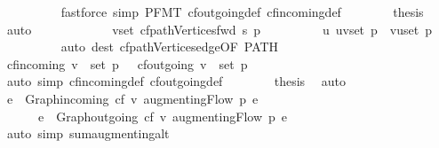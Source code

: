 \begin{isabellebody}
\ \ \ \ \ \ \ \ \isamarkupfalse%
\ {\isacharparenleft}fastforce\ simp{\isacharcolon}\ P{\isacharunderscore}FMT\ cf{\isachardot}outgoing{\isacharunderscore}def\ cf{\isachardot}incoming{\isacharunderscore}def{\isacharparenright}{\isacharplus}\isanewline
\ \ \ \ \ \ \isamarkupfalse%
\ {\isacharquery}thesis\ \isamarkupfalse%
\ auto\isanewline
\ \ \ \ \isamarkupfalse%
\isanewline
\ \ \ \ \ \ \isamarkupfalse%
\ {\isachardoublequoteopen}v{\isasymnotin}set\ {\isacharparenleft}cf{\isachardot}pathVertices{\isacharunderscore}fwd\ s\ p{\isacharparenright}{\isachardoublequoteclose}\isanewline
\ \ \ \ \ \ \isamarkupfalse%
\ \isamarkupfalse%
\ {\isachardoublequoteopen}{\isasymforall}u{\isachardot}\ {\isacharparenleft}u{\isacharcomma}v{\isacharparenright}{\isasymnotin}set\ p\ {\isasymand}\ {\isacharparenleft}v{\isacharcomma}u{\isacharparenright}{\isasymnotin}set\ p{\isachardoublequoteclose}\isanewline
\ \ \ \ \ \ \ \ \isamarkupfalse%
\ {\isacharparenleft}auto\ dest{\isacharcolon}\ cf{\isachardot}pathVertices{\isacharunderscore}edge{\isacharbrackleft}OF\ PATH{\isacharbrackright}{\isacharparenright}\isanewline
\ \ \ \ \ \ \isamarkupfalse%
\ {\isachardoublequoteopen}cf{\isachardot}incoming\ v\ {\isasyminter}\ set\ p\ {\isacharequal}\ {\isacharbraceleft}{\isacharbraceright}{\isachardoublequoteclose}\ {\isachardoublequoteopen}cf{\isachardot}outgoing\ v\ {\isasyminter}\ set\ p\ {\isacharequal}\ {\isacharbraceleft}{\isacharbraceright}{\isachardoublequoteclose}\isanewline
\ \ \ \ \ \ \ \ \isamarkupfalse%
\ {\isacharparenleft}auto\ simp{\isacharcolon}\ cf{\isachardot}incoming{\isacharunderscore}def\ cf{\isachardot}outgoing{\isacharunderscore}def{\isacharparenright}\isanewline
\ \ \ \ \ \ \isamarkupfalse%
\ {\isacharquery}thesis\ \isamarkupfalse%
\ auto\isanewline
\ \ \ \ \isamarkupfalse%
\ \ \isanewline
\ \ \ \ \isamarkupfalse%
\ {\isachardoublequoteopen}{\isacharparenleft}{\isasymSum}e\ {\isasymin}\ Graph{\isachardot}incoming\ cf\ v{\isachardot}\ {\isacharparenleft}augmentingFlow\ p{\isacharparenright}\ e{\isacharparenright}\ {\isacharequal}\isanewline
\ \ \ \ \ \ {\isacharparenleft}{\isasymSum}e\ {\isasymin}\ Graph{\isachardot}outgoing\ cf\ v{\isachardot}\ {\isacharparenleft}augmentingFlow\ p{\isacharparenright}\ e{\isacharparenright}{\isachardoublequoteclose}\isanewline
\ \ \ \ \ \ \isamarkupfalse%
\ {\isacharparenleft}auto\ simp{\isacharcolon}\ sum{\isacharunderscore}augmenting{\isacharunderscore}alt{\isacharparenright}\isanewline

\end{isabellebody}
